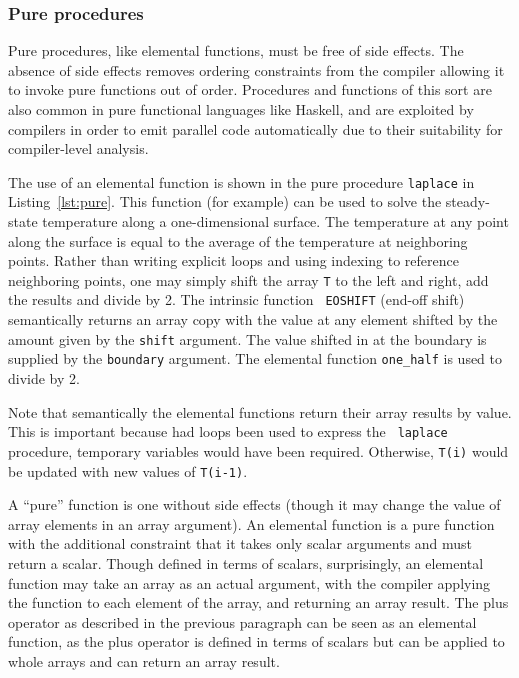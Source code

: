 \documentclass[10pt, conference, compsocconf]{IEEEtran}
\begin{document}
\subsubsection*{Pure procedures}

Pure procedures, like elemental functions, must be free of side effects.
The absence of side effects removes ordering constraints from the compiler
allowing it to invoke pure functions out of order.  Procedures and functions
of this sort are also common in pure functional languages like Haskell,
and are exploited by compilers in order to emit parallel code automatically
due to their suitability for compiler-level analysis.

The use of an elemental function is shown in the pure procedure {\tt laplace}
in Listing~\ref{lst:pure}. This function (for example) can be used to solve
the steady-state temperature along a one-dimensional surface. The temperature
at any point along the surface is equal to the average of the temperature at
neighboring points. Rather than writing explicit loops and using indexing to
reference neighboring points, one may simply shift the array {\tt T} to the
left and right, add the results and divide by 2. The intrinsic function {\tt
EOSHIFT} (end-off shift) semantically returns an array copy with the value at
any element shifted by the amount given by the {\tt shift} argument. The value
shifted in at the boundary is supplied by the {\tt boundary} argument. The
elemental function {\tt one\_half} is used to divide by 2.

Note that semantically the elemental functions return their array results by
value. This is important because had loops been used to express the {\tt
laplace} procedure, temporary variables would have been required. Otherwise,
{\tt T(i)} would be updated with new values of {\tt T(i-1)}.

 A ``pure'' function is one
without side effects (though it may change the value of array elements in an
array argument). An elemental function is a pure function with the additional
constraint that it takes only scalar arguments and must return a scalar.
Though defined in terms of scalars, surprisingly, an elemental function may
take an array as an actual argument, with the compiler applying the function
to each element of the array, and returning an array result. The plus operator
as described in the previous paragraph can be seen as an elemental function,
as the plus operator is defined in terms of scalars but can be applied to
whole arrays and can return an array result.
\end{document}
